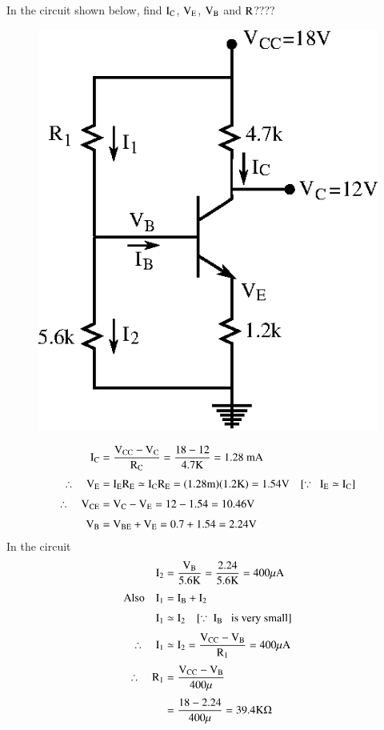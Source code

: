\begin{problem}\label{prob3.11}
In the circuit shown below, find $\textrm{I}_{\textrm{C}}$, $\textrm{V}_{\textrm{E}}$, $\textrm{V}_{\textrm{B}}$ and $\textrm{R}$????
\begin{figure}[H]
\centering
\includegraphics{chap3/fig3.26.eps}
\end{figure}
\end{problem}

\begin{solution}
\begin{align*}
\rmI_{\rmC} &= \frac{\rmV_{\text{CC}}-\rmV_{\rmC}}{\rmR_{\rmC}} = \frac{18-12}{4.7\rmK}=1.28\text{~mA}\\[3pt]
\therefore\quad \rmV_{\rmE} &= \rmI_{\rmE}\rmR_{\rmE}\simeq \rmI_{\rmC}\rmR_{\rmE}=(1.28\rmm)(1.2\rmK)=1.54\rmV\quad [\because \ \ \rmI_{\rmE}\simeq \rmI_{\rmC}]\\[3pt]
\therefore\quad \rmV_{\text{CE}} &= \rmV_{\rmC}-\rmV_{\rmE}=12-1.54=10.46\rmV\\[3pt]
\rmV_{\rmB} &= \rmV_{\text{BE}}+\rmV_{\rmE}=0.7+1.54=2.24\rmV
\end{align*}
In the circuit
\begin{align*}
\textrm{I}_{2} &= \frac{\textrm{V}_{\textrm{B}}}{5.6\textrm{K}}=\frac{2.24}{5.6\textrm{K}}=400\mu\textrm{A}\\[3pt]
\text{Also}\quad \textrm{I}_{1} &= \textrm{I}_{\textrm{B}}+\textrm{I}_{2}\\[3pt]
\textrm{I}_{1} &\simeq \textrm{I}_{2}\quad [\because \ \textrm{I}_{\textrm{B}}\text{~~ is very small}]\\[3pt]
\therefore\quad \textrm{I}_{1} &\simeq \textrm{I}_{2} =\frac{\textrm{V}_{\text{CC}}-\textrm{V}_{\textrm{B}}}{\textrm{R}_{1}}=400\mu\textrm{A}\\[3pt]
\therefore\quad \textrm{R}_{1} &= \frac{\textrm{V}_{\text{CC}}-\textrm{V}_{\textrm{B}}}{400\mu}\\[3pt]
&= \frac{18-2.24}{400\mu}=39.4\textrm{K}\Omega
\end{align*}
\end{solution}


\label{3end}
